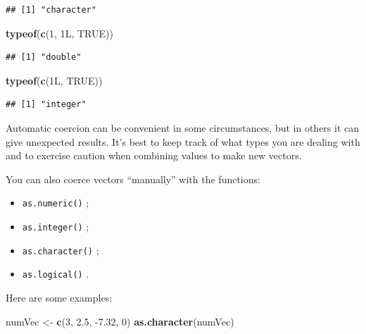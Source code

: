 \documentclass[]{book}
\makeatletter
\newenvironment{Shaded}{\begin{snugshade}}{\end{snugshade}}
\newcommand{\KeywordTok}[1]{\textcolor[rgb]{0.13,0.29,0.53}{\textbf{{#1}}}}
\newcommand{\DecValTok}[1]{\textcolor[rgb]{0.00,0.00,0.81}{{#1}}}
\newcommand{\FloatTok}[1]{\textcolor[rgb]{0.00,0.00,0.81}{{#1}}}
\newcommand{\StringTok}[1]{\textcolor[rgb]{0.31,0.60,0.02}{{#1}}}
\newcommand{\OtherTok}[1]{\textcolor[rgb]{0.56,0.35,0.01}{{#1}}}
\newcommand{\NormalTok}[1]{{#1}}
\providecommand{\tightlist}{%
  \setlength{\itemsep}{0pt}\setlength{\parskip}{0pt}}
\newenvironment{kframe}{%
\medskip{}
\setlength{\fboxsep}{.8em}
 \def\at@end@of@kframe{}%
 \ifinner\ifhmode%
  \def\at@end@of@kframe{\end{minipage}}%
  \begin{minipage}{\columnwidth}%
 \fi\fi%
 \def\FrameCommand##1{\hskip\@totalleftmargin \hskip-\fboxsep
 \colorbox{shadecolor}{##1}\hskip-\fboxsep
     \hskip-\linewidth \hskip-\@totalleftmargin \hskip\columnwidth}%
 \MakeFramed {\advance\hsize-\width
   \@totalleftmargin\z@ \linewidth\hsize
   \@setminipage}}%
 {\par\unskip\endMakeFramed%
 \at@end@of@kframe}
\renewenvironment{Shaded}{\begin{kframe}}{\end{kframe}}
\theoremstyle{definition}
\theoremstyle{definition}
\theoremstyle{remark}
\makeatother
\begin{document}
\begin{verbatim}
## [1] "character"
\end{verbatim}

\begin{Shaded}
\begin{Highlighting}[]
\KeywordTok{typeof}\NormalTok{(}\KeywordTok{c}\NormalTok{(}\DecValTok{1}\NormalTok{, 1L, }\OtherTok{TRUE}\NormalTok{))}
\end{Highlighting}
\end{Shaded}

\begin{verbatim}
## [1] "double"
\end{verbatim}

\begin{Shaded}
\begin{Highlighting}[]
\KeywordTok{typeof}\NormalTok{(}\KeywordTok{c}\NormalTok{(1L, }\OtherTok{TRUE}\NormalTok{))}
\end{Highlighting}
\end{Shaded}

\begin{verbatim}
## [1] "integer"
\end{verbatim}

Automatic coercion can be convenient in some circumstances, but in
others it can give unexpected results. It's best to keep track of what
types you are dealing with and to exercise caution when combining values
to make new vectors.

You can also coerce vectors ``manually'' with the functions:

\begin{itemize}
\tightlist
\item
  \texttt{as.numeric()}
  ;
\item
  \texttt{as.integer()}
  ;
\item
  \texttt{as.character()}
  ;
\item
  \texttt{as.logical()}
  .
\end{itemize}

Here are some examples:

\begin{Shaded}
\begin{Highlighting}[]
\NormalTok{numVec <-}\StringTok{ }\KeywordTok{c}\NormalTok{(}\DecValTok{3}\NormalTok{, }\FloatTok{2.5}\NormalTok{, -}\FloatTok{7.32}\NormalTok{, }\DecValTok{0}\NormalTok{)}
\KeywordTok{as.character}\NormalTok{(numVec)}
\end{Highlighting}
\end{Shaded}
\end{document}

